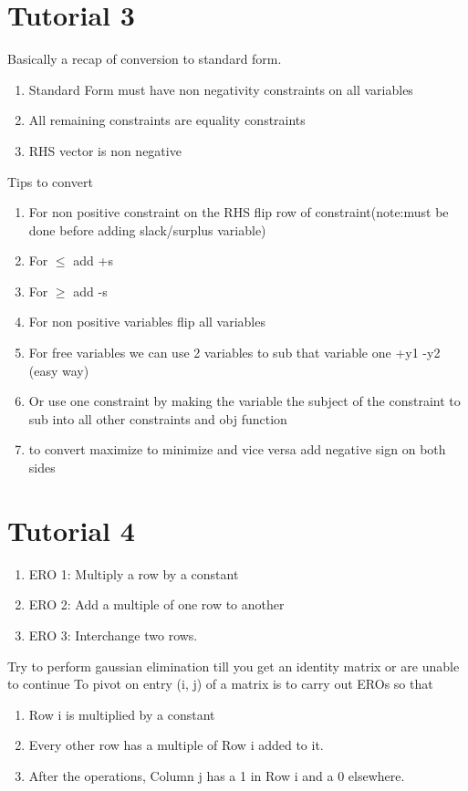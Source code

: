 \documentclass{article}
\begin{document}
\section {Tutorial 3}
Basically a recap of conversion to standard form.\\
\begin{enumerate}
\item Standard Form must have non negativity constraints on all variables
\item All remaining constraints are equality constraints
\item RHS vector is non negative
\end{enumerate}
Tips to convert
\begin{enumerate}
\item For non positive constraint on the RHS flip row of constraint(note:must be done before adding slack/surplus variable)
\item For $\leq$ add +s
\item For $\geq$ add -s
\item For non positive variables flip all variables
\item For free variables we can use 2 variables to sub that variable one +y1 -y2 (easy way)
\item Or use one constraint by making the variable the subject of the constraint to sub into all other constraints and obj function
\item to convert maximize to minimize and vice versa add negative sign on both sides
\end{enumerate}
\section{Tutorial 4}
\begin{enumerate}
  \item ERO 1:  Multiply a row by a constant
  \item ERO 2:  Add a multiple of one row to another
  \item ERO 3:  Interchange two rows.
\end{enumerate}
Try to perform gaussian elimination till you get an identity matrix or are unable to continue
To pivot on entry (i, j) of a matrix is to carry out EROs so that
\begin{enumerate}
  \item Row i is multiplied by a constant
  \item Every other row has a multiple of Row i added to it.
  \item After the operations, Column j has a 1 in Row i and a 0 elsewhere.
\end{enumerate}
\end{document}
